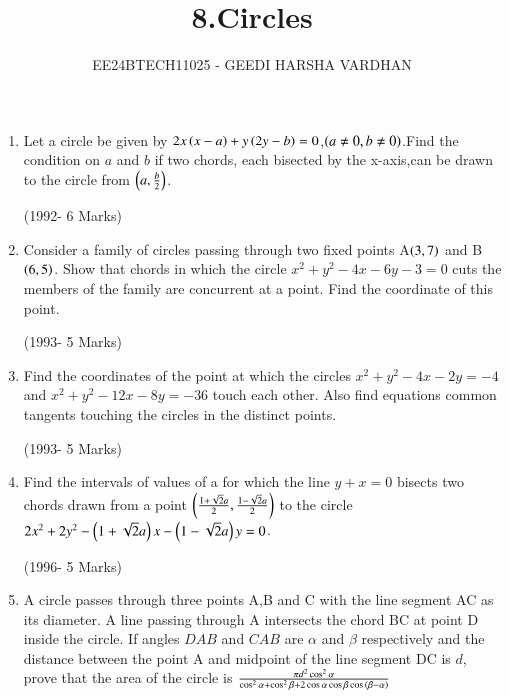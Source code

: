 \documentclass[journal,12pt,twocolumn]{IEEEtran}
\theoremstyle{remark}
\begin{document}

\vspace{3cm}

\title{8.Circles }
\author{EE24BTECH11025 - GEEDI HARSHA VARDHAN }
\maketitle
\newpage
\bigskip

\renewcommand{\thefigure}{\theenumi}
\renewcommand{\thetable}{\theenumi}

\begin{enumerate}

	\item Let a circle be given by $2x\left(x-a\right)+y\left(2y-b\right)=0$,$\left(a\neq0,b\neq0\right)$.Find the condition on $a$ and $b$ if two chords, each bisected by the x-axis,can be drawn to the circle from $\left(a,\frac{b}{2}\right)$.                         

\hfill(1992- 6 Marks)\\




\item Consider a family of circles passing through two fixed points A$\left(3,7\right)$ and B$\left(6,5\right)$. Show that chords in which the circle $x^2+y^2-4x-6y-3=0$ cuts the members of the family are concurrent at a point. Find the coordinate of this point.
	        
\hfill(1993- 5 Marks)\\





\item Find the coordinates of the point at which the circles $x^2+y^2-4x-2y=-4$ and $x^2+y^2-12x-8y=-36$ touch each other. Also find equations common tangents touching the circles in the distinct points.                        

\hfill(1993- 5 Marks)\\


\item Find the intervals of values of a for which the line $y+x=0$ bisects two chords drawn from a point $\left(\frac{1+\sqrt{2}a}{2},\frac{1-\sqrt{2}a}{2}\right)$ to the circle $2x^2+2y^2-\left(1+\sqrt{2}a\right)x-\left(1-\sqrt{2}a\right)y=0$.  

\hfill(1996- 5 Marks)\\





\item A circle passes through three points A,B and C with the line segment AC as its diameter. A line passing through A intersects the chord BC at point D inside the circle. If angles $DAB$ and $CAB$ are $\alpha$ and $\beta$ respectively and the distance between the point A and midpoint of the line segment DC is $d$, prove that the area of the circle is $\frac{\pi d^2 \cos^2{\alpha} }{\cos^2{\alpha}+\cos^2{\beta}+ 2\cos{\alpha} \cos{\beta} \cos{\ensuremath{\left(\beta-\alpha\right)}}}$                


\end{enumerate}
\end{document}
